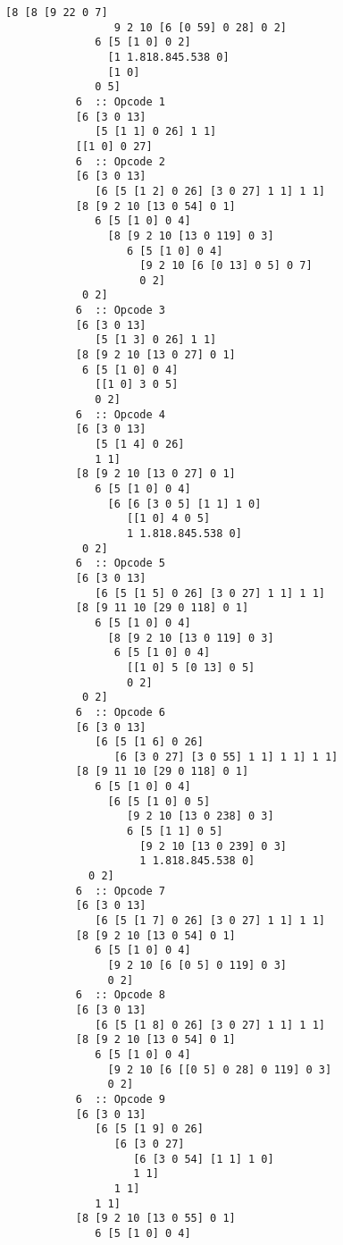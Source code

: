 \documentclass[twoside]{article}
\begin{document}
\begin{lstlisting}[style=listingcode]
           [8 [8 [9 22 0 7]
                 9 2 10 [6 [0 59] 0 28] 0 2]
              6 [5 [1 0] 0 2]
                [1 1.818.845.538 0]
                [1 0]
              0 5]
           6  :: Opcode 1
           [6 [3 0 13]
              [5 [1 1] 0 26] 1 1]
           [[1 0] 0 27]
           6  :: Opcode 2
           [6 [3 0 13]
              [6 [5 [1 2] 0 26] [3 0 27] 1 1] 1 1]
           [8 [9 2 10 [13 0 54] 0 1]
              6 [5 [1 0] 0 4]
                [8 [9 2 10 [13 0 119] 0 3]
                   6 [5 [1 0] 0 4]
                     [9 2 10 [6 [0 13] 0 5] 0 7]
                     0 2]
            0 2]
           6  :: Opcode 3
           [6 [3 0 13]
              [5 [1 3] 0 26] 1 1]
           [8 [9 2 10 [13 0 27] 0 1]
            6 [5 [1 0] 0 4]
              [[1 0] 3 0 5]
              0 2]
           6  :: Opcode 4
           [6 [3 0 13]
              [5 [1 4] 0 26]
              1 1]
           [8 [9 2 10 [13 0 27] 0 1]
              6 [5 [1 0] 0 4]
                [6 [6 [3 0 5] [1 1] 1 0]
                   [[1 0] 4 0 5]
                   1 1.818.845.538 0]
            0 2]
           6  :: Opcode 5
           [6 [3 0 13]
              [6 [5 [1 5] 0 26] [3 0 27] 1 1] 1 1]
           [8 [9 11 10 [29 0 118] 0 1]
              6 [5 [1 0] 0 4]
                [8 [9 2 10 [13 0 119] 0 3]
                 6 [5 [1 0] 0 4]
                   [[1 0] 5 [0 13] 0 5]
                   0 2]
            0 2]
           6  :: Opcode 6
           [6 [3 0 13]
              [6 [5 [1 6] 0 26]
                 [6 [3 0 27] [3 0 55] 1 1] 1 1] 1 1]
           [8 [9 11 10 [29 0 118] 0 1]
              6 [5 [1 0] 0 4]
                [6 [5 [1 0] 0 5]
                   [9 2 10 [13 0 238] 0 3]
                   6 [5 [1 1] 0 5]
                     [9 2 10 [13 0 239] 0 3]
                     1 1.818.845.538 0]
             0 2]
           6  :: Opcode 7
           [6 [3 0 13]
              [6 [5 [1 7] 0 26] [3 0 27] 1 1] 1 1]
           [8 [9 2 10 [13 0 54] 0 1]
              6 [5 [1 0] 0 4]
                [9 2 10 [6 [0 5] 0 119] 0 3]
                0 2]
           6  :: Opcode 8
           [6 [3 0 13]
              [6 [5 [1 8] 0 26] [3 0 27] 1 1] 1 1]
           [8 [9 2 10 [13 0 54] 0 1]
              6 [5 [1 0] 0 4]
                [9 2 10 [6 [[0 5] 0 28] 0 119] 0 3]
                0 2]
           6  :: Opcode 9
           [6 [3 0 13]
              [6 [5 [1 9] 0 26]
                 [6 [3 0 27]
                    [6 [3 0 54] [1 1] 1 0]
                    1 1]
                 1 1]
              1 1]
           [8 [9 2 10 [13 0 55] 0 1]
              6 [5 [1 0] 0 4]

\end{lstlisting}
\end{document}
